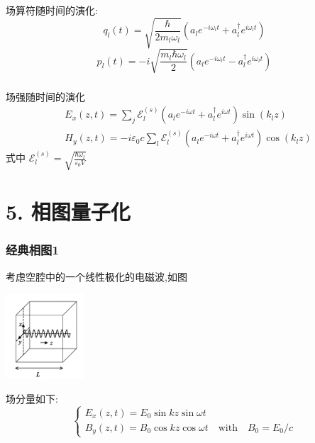 \begin{frame}
 \frametitle{}
 场算符随时间的演化:
\[ q_{l}(t)=\sqrt{\frac{\hbar}{2 m_{l} \omega_{l}}}\left(a_{l} e^{-i \omega_{l} t}+a_{l}^{\dagger} e^{i \omega_{l} t}\right) \]
\[ p_{l}(t)=-i \sqrt{\frac{m_{l} \hbar \omega_{l}}{2}}\left(a_{l} e^{-i \omega_{l} t}-a_{l}^{\dagger} e^{i \omega_{l} t}\right) \]   
\end{frame}

\begin{frame}
 \frametitle{}
  场强随时间的演化 
  \[ 
    \begin{aligned}
      &E_{x}(z, t)=\sum_{j} \mathcal{E}_{l}^{(s)}\left(a_{l} e^{-i \omega t}+a_{l}^{\dagger} e^{i \omega t}\right) \sin \left(k_{l} z\right) \\
      &H_{y}(z, t)=-i \varepsilon_{0} c \sum_{l} \mathcal{E}_{l}^{(s)}\left(a_{l} e^{-i \omega t}+a_{l}^{\dagger} e^{i \omega t}\right) \cos \left(k_{l} z\right)
    \end{aligned} 
  \]
式中 $\mathcal{E}_{l}^{(s)}=\sqrt{\frac{\hbar \omega_{l}}{\varepsilon_{0} V}}$
\end{frame}

\section{5. 相图量子化}

\begin{frame}
  \frametitle{经典相图1}
  考虑空腔中的一个线性极化的电磁波,如图
    \begin{center}
       \includegraphics[width=0.22\textwidth]{figs/2022-04-27-12-37-33.png}
    \end{center}
   场分量如下:  
   \[ \begin{cases}
    E_{x}(z, t)=E_{0} \sin k z \sin \omega t \\ 
    B_{y}(z, t)=B_{0} \cos k z \cos \omega t  \quad \text{with} \quad B_{0} = E_{0} /c 
   \end{cases} \]
 \end{frame}
 
